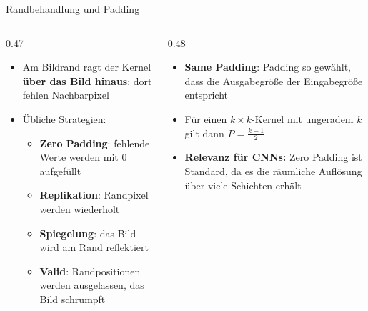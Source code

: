 {%
\begin{frame}{Randbehandlung und Padding}
\begin{columns}
\begin{column}{0.47\textwidth}
\begin{itemize}
    \item Am Bildrand ragt der Kernel \textbf{über das Bild hinaus}: dort fehlen Nachbarpixel
    \item Übliche Strategien:
    \begin{itemize}
        \item \textbf{Zero Padding}: fehlende Werte werden mit $0$ aufgefüllt
        \item \textbf{Replikation}: Randpixel werden wiederholt
        \item \textbf{Spiegelung}: das Bild wird am Rand reflektiert
        \item \textbf{Valid}: Randpositionen werden ausgelassen, das Bild schrumpft
    \end{itemize}
\end{itemize}
\end{column}
\begin{column}{0.48\textwidth}
\begin{itemize}
    \item \textbf{Same Padding}: Padding so gewählt, dass die Ausgabegröße der Eingabegröße entspricht
    \item Für einen $k \times k$-Kernel mit ungeradem $k$ gilt dann $P = \frac{k-1}{2}$
    \item \textbf{Relevanz für CNNs:} Zero Padding ist Standard, da es die räumliche Auflösung über viele Schichten erhält
\end{itemize}
\end{column}
\end{columns}
\end{frame}

}
